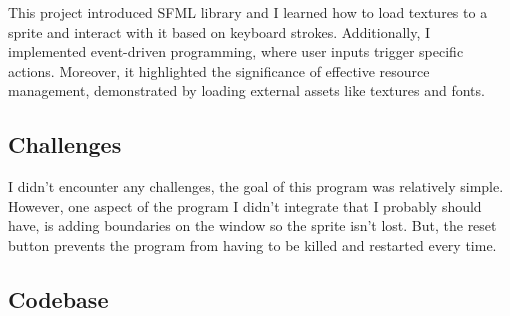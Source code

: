 This project introduced SFML library and I learned how to load textures to a sprite and interact with it based on keyboard strokes. Additionally, I implemented event-driven programming, where user inputs trigger specific actions. Moreover, it highlighted the significance of effective resource management, demonstrated by loading external assets like textures and fonts. 

\subsection{Challenges}\label{sec:ps0:challenges}

I didn't encounter any challenges, the goal of this program was relatively simple. However, one aspect of the program I didn't integrate that I probably should have, is adding boundaries on the window so the sprite isn't lost. But, the reset button prevents the program from having to be killed and restarted every time.

\subsection{Codebase}\label{sec:ps0:code}




\newpage
